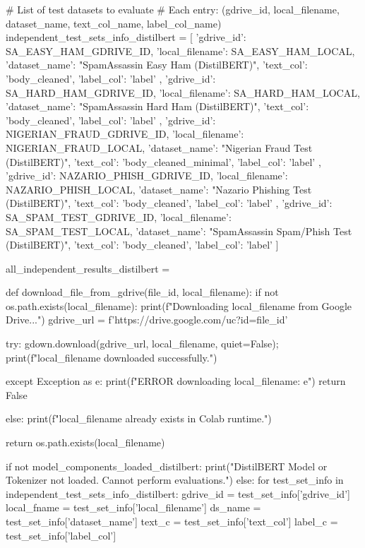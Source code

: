 \begin{ffcode}
# List of test datasets to evaluate
# Each entry: (gdrive_id, local_filename, dataset_name, text_col_name, label_col_name)
independent_test_sets_info_distilbert = [
    {
        'gdrive_id': SA_EASY_HAM_GDRIVE_ID,
        'local_filename': SA_EASY_HAM_LOCAL,
        'dataset_name': "SpamAssassin Easy Ham (DistilBERT)",
        'text_col': 'body_cleaned',
        'label_col': 'label'
    },
    {
        'gdrive_id': SA_HARD_HAM_GDRIVE_ID,
        'local_filename': SA_HARD_HAM_LOCAL,
        'dataset_name': "SpamAssassin Hard Ham (DistilBERT)",
        'text_col': 'body_cleaned',
        'label_col': 'label'
    },
    {
        'gdrive_id': NIGERIAN_FRAUD_GDRIVE_ID,
        'local_filename': NIGERIAN_FRAUD_LOCAL,
        'dataset_name': "Nigerian Fraud Test (DistilBERT)",
        'text_col': 'body_cleaned_minimal',
        'label_col': 'label'
    },
    {
        'gdrive_id': NAZARIO_PHISH_GDRIVE_ID,
        'local_filename': NAZARIO_PHISH_LOCAL,
        'dataset_name': "Nazario Phishing Test (DistilBERT)",
        'text_col': 'body_cleaned',
        'label_col': 'label'
    },
    {
        'gdrive_id': SA_SPAM_TEST_GDRIVE_ID,
        'local_filename': SA_SPAM_TEST_LOCAL,
        'dataset_name': "SpamAssassin Spam/Phish Test (DistilBERT)",
        'text_col': 'body_cleaned',
        'label_col': 'label'
    }
]

all_independent_results_distilbert = {}

def download_file_from_gdrive(file_id, local_filename):
    if not os.path.exists(local_filename):
        print(f"Downloading {local_filename} from Google Drive...")
        gdrive_url = f'https://drive.google.com/uc?id={file_id}'

        try:
            gdown.download(gdrive_url, local_filename, quiet=False);
            print(f"{local_filename} downloaded successfully.")

        except Exception as e:
            print(f"ERROR downloading {local_filename}: {e}")
            return False

    else:
        print(f"{local_filename} already exists in Colab runtime.")

    return os.path.exists(local_filename)


if not model_components_loaded_distilbert:
    print("DistilBERT Model or Tokenizer not loaded. Cannot perform evaluations.")
else:
    for test_set_info in independent_test_sets_info_distilbert:
        gdrive_id = test_set_info['gdrive_id']
        local_fname = test_set_info['local_filename']
        ds_name = test_set_info['dataset_name']
        text_c = test_set_info['text_col']
        label_c = test_set_info['label_col']


\end{ffcode}
